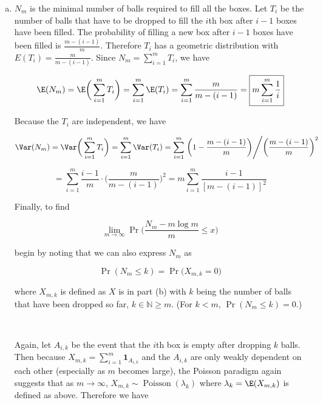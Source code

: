 \begin{enumerate}[(a)]
\item



\(N_m\) is the minimal number of balls required to fill all the boxes. Let \(T_i\) be the number of balls that have to be dropped to fill the \(i\)th box after \(i - 1\) boxes have been filled. The probability of filling a new box after \(i -1\) boxes have been filled is \( \frac{m - (i - 1)}{m}\). Therefore \(T_i\) has a geometric distribution with \(E(T_i) = \frac{m}{m - (i - 1)}\). Since \(N_m = \sum_{i=1}^m T_i\), we have


\[
\E(N_m) = \E \bigg(  \sum_{i=1}^m T_i   \bigg) =  \sum_{i=1}^m \E( T_i )  =  \sum_{i=1}^m \frac{m}{m - (i - 1)} = \boxed{m  \sum_{i=1}^m \frac{1}{i }}
\]

Because the \(T_i\) are independent, we have

\[
\Var(N_m) = \Var \bigg(  \sum_{i=1}^m T_i   \bigg) =  \sum_{i=1}^m \Var( T_i )  =  \sum_{i=1}^m \left. \bigg( 1 -  \frac{m - (i - 1)}{m} \bigg) \middle/ \bigg( \frac{m - (i - 1)}{m} \bigg)^2 \right.
\]

\[
=  \sum_{i=1}^m  \frac{  i - 1}{m} \cdot \bigg( \frac{m}{m - (i - 1)} \bigg)^2 = \boxed{  m\sum_{i=1}^m  \frac{ i - 1}{[m - (i - 1)]^2} }
\]


Finally, to find

\[
\lim_{m \to \infty} \Pr \bigg( \frac{N_m - m \log m}{m} \leq x \bigg) 
\]

begin by noting that we can also express \(N_m\) as 

\[
\Pr(N_m \leq k) = \Pr \big( X_{m, k} = 0 \big)
\]

where \(X_{m, k}\) is defined as \(X\) is in part (b) with \(k\) being the number of balls that have been dropped so far, \(k \in \mathbb{N} \geq m\). (For \(k < m\), \(\Pr(N_m \leq k) = 0\).)

\

Again, let \(A_{i,k}\) be the event that the \(i\)th box is empty after dropping \(k\) balls. Then because \(X_{m, k} = \sum_{i=1}^m \boldsymbol{1}_{A_{i,k}}\) and the \(A_{i,k}\) are only weakly dependent on each other (especially as \(m\) becomes large), the Poisson paradigm again suggests that as \(m \to \infty\), \(X_{m, k} \sim \operatorname{Poisson}(\lambda_k)\) where \(\lambda_k = \E(X_{m,k})\) is defined as above. Therefore we have


\end{enumerate}

